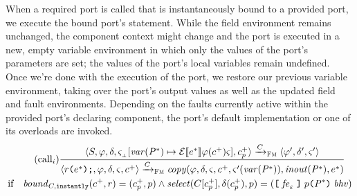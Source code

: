 \documentclass[a4paper,10pt,english]{article}
\begin{document}
When a required port is called that is instantaneously bound to a provided port, we execute the bound port's statement.
While the field environment remains unchanged, the component context might change and the port is executed in a new, empty
variable environment in which only the values of the port's parameters are set; the values of the port's local variables remain undefined. Once we're
done with the execution of the port, we restore our previous variable environment, taking over the port's output values as well
as the updated field and fault environments. Depending on the faults currently active within the provided port's
declaring component, the port's default implementation or one of its overloads are invoked.
\begin{multline*}
	\tag{call${_i}$}
	\dfrac
	{
		\configurationFm{\stmFm, \fieldEnv, \faultEnv, \varEnvFmEmpty[\varof(\toList{\parameterDecl}) \mapsto
		\ExprSem{\toList{\expr}}\fieldEnv(\toListNE{\comp})\varEnvFm],
		\toListNE{\comp}_\provPort}
			\stmArrowFm
		\configurationFm{\fieldEnv', \faultEnv', \varEnvFm'}
	}
	{
		\configurationFm{\invokeReqPort{\reqPort}{\toList{\expr}}, \fieldEnv, \faultEnv, \varEnvFm, \toListNE{\comp}}
			\stmArrowFm
		\copyout(\fieldEnv, \faultEnv, \varEnvFm, \toListNE{\comp},
		\varEnvFm'(\varof(\toList{\parameterDecl})), \isinout(\toList{\parameterDecl}), \toList{\expr}) 
	}
	\\ \text{if} \quad \boundof_{\compDecl, \instantBindingType}(\toListNE{\comp},
	\reqPort) = (\toListNE{\comp}_\provPort, \provPort) \wedge
	\select(\compDecl[\toListNE{\comp}_\provPort], \faultEnv(\toListNE{\comp}_\provPort),
	\provPort) = (\provPortDeclSyn{\provPort}{\toList{\parameterDecl}}{\behavior}{\liftMissing{\faultExpr}})
\end{multline*}
\end{document}
